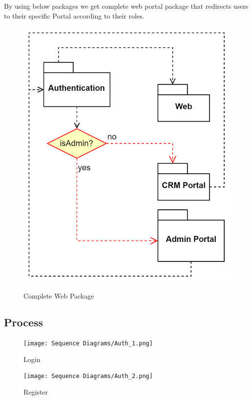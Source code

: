 By using below packages we get complete web portal package that redirects users to their specific Portal according to their roles.
\begin{figure}[H]
	\begin{center}
		{\includegraphics[scale=1.2]{figures/web Concept/web-web portal.png}}
		\caption{Complete Web Package}
		\label{web_package}
	\end{center}
\end{figure}


\newpage
\subsection{Process}
\begin{figure}[H]
	\begin{center}
		{\texttt{[image: Sequence Diagrams/Auth\_1.png]}}
		\caption{Login}
	\end{center}
\end{figure}

\newpage
\begin{figure}[H]
	\begin{center}
		{\texttt{[image: Sequence Diagrams/Auth\_2.png]}}
		\caption{Register}
	\end{center}
\end{figure}

